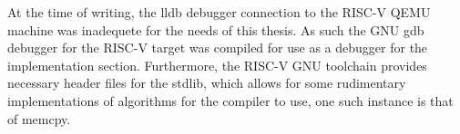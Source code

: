 At the time of writing, the lldb debugger connection to the RISC-V QEMU machine
was inadequete for the needs of this thesis. As such the GNU gdb debugger for
the RISC-V target was compiled for use as a debugger for the implementation
section. Furthermore, the RISC-V GNU toolchain provides necessary header files
for the stdlib, which allows for some rudimentary implementations of algorithms
for the compiler to use, one such instance is that of memcpy.

